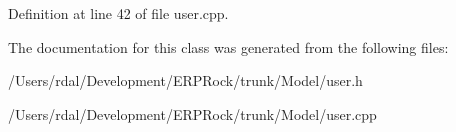\-Definition at line 42 of file user.\-cpp.



\-The documentation for this class was generated from the following files\-:\begin{DoxyCompactItemize}
\item 
/\-Users/rdal/\-Development/\-E\-R\-P\-Rock/trunk/\-Model/user.\-h\item 
/\-Users/rdal/\-Development/\-E\-R\-P\-Rock/trunk/\-Model/user.\-cpp\end{DoxyCompactItemize}
